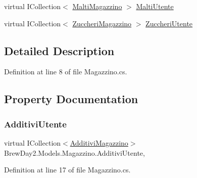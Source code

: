 \begin{DoxyCompactItemize}
virtual I\+Collection$<$ \mbox{\hyperlink{class_brew_day2_1_1_models_1_1_malti_magazzino}{Malti\+Magazzino}} $>$ \mbox{\hyperlink{class_brew_day2_1_1_models_1_1_magazzino_abe1d9a718bf41213bda45bccd01c73c6}{Malti\+Utente}}
\item 
virtual I\+Collection$<$ \mbox{\hyperlink{class_brew_day2_1_1_models_1_1_zuccheri_magazzino}{Zuccheri\+Magazzino}} $>$ \mbox{\hyperlink{class_brew_day2_1_1_models_1_1_magazzino_a1ec01b1101ed7d84c35da0005ce6a1ca}{Zuccheri\+Utente}}
\end{DoxyCompactItemize}


\subsection{Detailed Description}


Definition at line 8 of file Magazzino.\+cs.



\subsection{Property Documentation}
\mbox{\label{class_brew_day2_1_1_models_1_1_magazzino_ab4f37d277f6de51f9812882f8f1bf689}} 
\subsubsection{\texorpdfstring{Additivi\+Utente}{AdditiviUtente}}
{\footnotesize\ttfamily virtual I\+Collection$<$\mbox{\hyperlink{class_brew_day2_1_1_models_1_1_additivi_magazzino}{Additivi\+Magazzino}}$>$ Brew\+Day2.\+Models.\+Magazzino.\+Additivi\+Utente\hspace{0.3cm}{\ttfamily [get]}, {\ttfamily [set]}}



Definition at line 17 of file Magazzino.\+cs.

\mbox{\label{class_brew_day2_1_1_models_1_1_magazzino_a0e8192ed1f2c332af0a0497b1b47e4c8}} 
